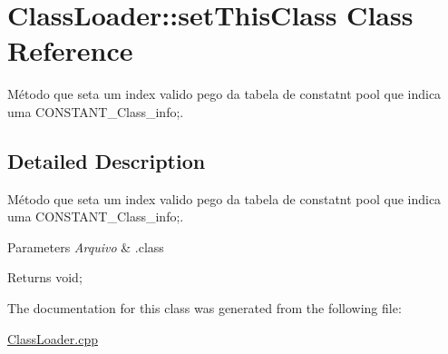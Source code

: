 \hypertarget{class_class_loader_1_1set_this_class}{}\section{Class\+Loader\+:\+:set\+This\+Class Class Reference}
\label{class_class_loader_1_1set_this_class}


Método que seta um index valido pego da tabela de constatnt pool que indica uma C\+O\+N\+S\+T\+A\+N\+T\+\_\+\+Class\+\_\+info;.  




\subsection{Detailed Description}
Método que seta um index valido pego da tabela de constatnt pool que indica uma C\+O\+N\+S\+T\+A\+N\+T\+\_\+\+Class\+\_\+info;. 


\begin{DoxyParams}{Parameters}
{\em Arquivo} & .class \\
\hline
\end{DoxyParams}
\begin{DoxyReturn}{Returns}
void; 
\end{DoxyReturn}


The documentation for this class was generated from the following file\+:\begin{DoxyCompactItemize}
\item 
\hyperlink{_class_loader_8cpp}{Class\+Loader.\+cpp}\end{DoxyCompactItemize}
